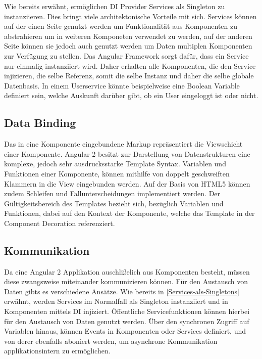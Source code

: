 Wie bereits erwähnt, ermöglichen \ac{DI} Provider Services als Singleton zu instanziieren.
Dies bringt viele architektonische Vorteile mit sich. Services können auf der einen Seite genutzt werden
um Funktionalität aus Komponenten zu abstrahieren um in weiteren Komponeten verwendet zu werden,
auf der anderen Seite können sie jedoch auch genutzt werden um Daten multiplen Komponenten zur Verfügung zu stellen.
Das Angular Framework sorgt dafür, dass ein Service nur einmalig instanziiert wird. Daher erhalten alle
Komponenten, die den Service injizieren, die selbe Referenz, somit die selbe Instanz und daher die selbe globale Datenbasis.
In einem Userservice könnte beispielweise eine Boolean Variable definiert sein, welche Auskunft darüber gibt,
ob ein User eingeloggt ist oder nicht. \cite[308]{Angular2}


\subsection{Data Binding}
Das in eine Komponente eingebundene Markup repräsentiert die Viewschicht einer Komponente.
Angular 2 besitzt zur Darstellung von Datenstrukturen eine komplexe, jedoch sehr ausdrucksstarke Template Syntax.
Variablen und Funktionen einer Komponente, können mithilfe von doppelt geschweiften Klammern in die View eingebunden werden.
Auf der Basis von HTML5 können zudem Schleifen und Fallunterscheidungen implementiert werden.
Der Gültigkeitsbereich des Templates bezieht sich, bezüglich Variablen und Funktionen, dabei auf den Kontext der Komponente,
welche das Template in der Component Decoration referenziert. \cite{Templ78:online}

\vspace{1cm}

\vspace{1cm}

\subsection{Kommunikation}

Da eine Angular 2 Applikation auschlißelich aus Komponenten besteht, müssen diese zwangsweise miteinander
kommunizieren können. Für den Austausch von Daten gibts es verschiedene Ansätze.
Wie bereits in \ref{Services-als-Singletons} erwähnt, werden Services im Normalfall als Singleton
instanziiert und in Komponenten mittels \ac{DI} injiziert. Öffentliche Servicefunktionen können hierbei für den
Austausch von Daten genutzt werden. Über den synchronen Zugriff auf Variablen hinaus,
können Events in Komponenten oder Services definiert, und von derer ebenfalls aboniert werden,
um asynchrone Kommunikation applikationsintern zu ermöglichen.

